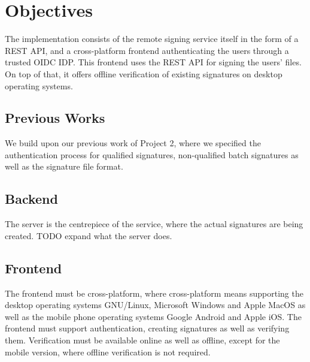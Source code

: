 \chapter*{Objectives}
\label{ch:objectives}

The implementation consists of the remote signing service itself in the form of a \gls{REST} \gls{API},
and a cross-platform frontend authenticating the users through a trusted \gls{OIDC} \gls{IDP}.
This frontend uses the \gls{REST} \gls{API} for signing the users' files.
On top of that, it offers offline verification of existing signatures on desktop operating systems.

\section{Previous Works}
\label{section:previousworks}

We build upon our previous work of Project 2\cite{projekt2}, where we specified the authentication process
for qualified signatures, non-qualified batch signatures as well as the signature file format.

\section{Backend}
\label{section:backend}

The server is the centrepiece of the service, where the actual signatures are being created. TODO expand what the server does.

\section{Frontend}
\label{section:frontend}

The frontend must be cross-platform, where cross-platform means supporting the desktop operating systems
GNU/Linux, Microsoft Windows and Apple MacOS as well as the mobile phone operating systems Google Android and Apple iOS.
The frontend must support authentication, creating signatures as well as verifying them.
Verification must be available online as well as offline, except for the mobile version, where offline verification is not required.
